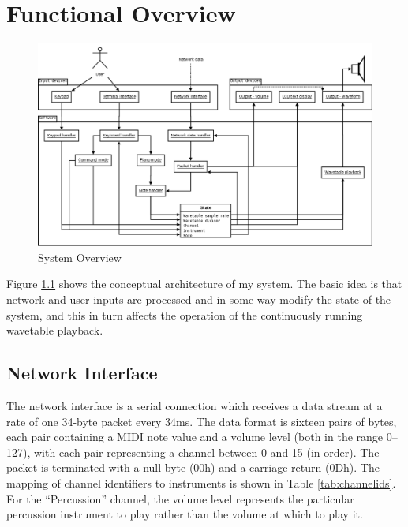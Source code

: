\chapter{Functional Overview}

\begin{nowordcount}
\begin{figure}[htbp]
\centering
\includegraphics[width=0.95\textheight,angle=90]{images/overview}
\caption{System Overview}\label{fig:systemoverview}
\end{figure}
\end{nowordcount}

Figure \ref{fig:systemoverview} shows the conceptual architecture of my system.  The basic idea is 
that network and user inputs are processed and in some way modify the state of the system, and this 
in turn affects the operation of the continuously running wavetable playback.

\section{Network Interface}
\label{sec:overview:network}

The network interface is a serial connection which receives a data stream at a rate of one 34-byte 
packet every 34ms.  The data format is sixteen pairs of bytes, each pair containing a MIDI note 
value and a volume level (both in the range 0--127), with each pair representing a channel between 0 
and 15 (in order).  The packet is terminated with a null byte (00h) and a carriage return (0Dh).  
The mapping of channel identifiers to instruments is shown in Table \ref{tab:channelids}.  For the 
``Percussion'' channel, the volume level represents the particular percussion instrument to play 
rather than the volume at which to play it.


